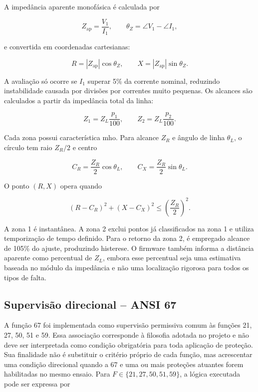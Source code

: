 A impedância aparente monofásica é calculada por

\begin{equation}
  Z_{\mathrm{ap}}=\frac{V_1}{I_1}, \qquad
  \theta_Z=\angle V_1-\angle I_1,
\end{equation}

e convertida em coordenadas cartesianas:

\begin{equation}
  R=|Z_{\mathrm{ap}}|\cos\theta_Z, \qquad
  X=|Z_{\mathrm{ap}}|\sin\theta_Z.
\end{equation}

A avaliação só ocorre se $I_1$ superar 5\% da corrente nominal, reduzindo instabilidade causada por divisões por correntes muito pequenas. Os alcances são calculados a partir da impedância total da linha:

\begin{equation}
  Z_1=Z_L\frac{p_1}{100}, \qquad
  Z_2=Z_L\frac{p_2}{100}.
\end{equation}

Cada zona possui característica mho. Para alcance $Z_R$ e ângulo de linha $\theta_L$, o círculo tem raio $Z_R/2$ e centro

\begin{equation}
  C_R=\frac{Z_R}{2}\cos\theta_L, \qquad
  C_X=\frac{Z_R}{2}\sin\theta_L.
\end{equation}

O ponto $(R,X)$ opera quando

\begin{equation}
  (R-C_R)^2+(X-C_X)^2\leq\left(\frac{Z_R}{2}\right)^2.
  \label{eq:mho-operacao}
\end{equation}

A zona 1 é instantânea. A zona 2 exclui pontos já classificados na zona 1 e utiliza temporização de tempo definido. Para o retorno da zona 2, é empregado alcance de 105\% do ajuste, produzindo histerese. O firmware também informa a distância aparente como percentual de $Z_L$, embora esse percentual seja uma estimativa baseada no módulo da impedância e não uma localização rigorosa para todos os tipos de falta.

\subsection{Supervisão direcional -- ANSI 67}

A função 67 foi implementada como supervisão permissiva comum às funções 21, 27, 50, 51 e 59. Essa associação corresponde à filosofia adotada no projeto e não deve ser interpretada como condição obrigatória para toda aplicação de proteção. Sua finalidade não é substituir o critério próprio de cada função, mas acrescentar uma condição direcional quando a 67 e uma ou mais proteções atuantes forem habilitadas no mesmo ensaio. Para $F\in\{21,27,50,51,59\}$, a lógica executada pode ser expressa por

